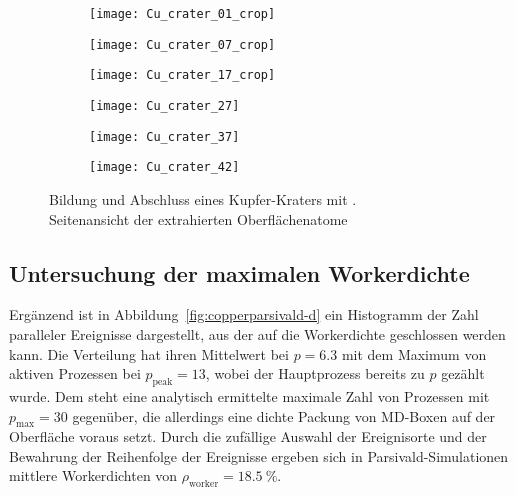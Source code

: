 \begin{figure}

  \captionsetup[subfigure]{justification=centering,singlelinecheck=false}
  \def\subfigwidth{0.32\textwidth}

  \begin{subfigure}[t]{\subfigwidth}
    \texttt{[image: Cu\_crater\_01\_crop]}
  \end{subfigure}
  \hfill
  \begin{subfigure}[t]{\subfigwidth}
    \texttt{[image: Cu\_crater\_07\_crop]}
  \end{subfigure}
  \hfill
  \begin{subfigure}[t]{\subfigwidth}
    \texttt{[image: Cu\_crater\_17\_crop]}
  \end{subfigure}

  \begin{subfigure}[t]{\subfigwidth}
    \texttt{[image: Cu\_crater\_27]}
  \end{subfigure}
  \hfill
  \begin{subfigure}[t]{\subfigwidth}
    \texttt{[image: Cu\_crater\_37]}
  \end{subfigure}
  \hfill
  \begin{subfigure}[t]{\subfigwidth}
    \texttt{[image: Cu\_crater\_42]}
  \end{subfigure}

  \caption[Bildung und Abschluss eines Kupfer-Kraters]{
    Bildung und Abschluss eines Kupfer-Kraters mit .\\
    Seitenansicht der extrahierten Oberflächenatome
  }
  \label{fig:coppercrater}
\end{figure}

\subsection{Untersuchung der maximalen Workerdichte}

Ergänzend ist in Abbildung~\ref{fig:copperparsivald-d} ein Histogramm der Zahl paralleler Ereignisse dargestellt, aus der auf die Workerdichte geschlossen werden kann.
Die Verteilung hat ihren Mittelwert bei $p = \num{6.3}$ mit dem Maximum von aktiven Prozessen bei $p_\text{peak} = \num{13}$, wobei der Hauptprozess bereits zu $p$ gezählt wurde.
Dem steht eine analytisch ermittelte maximale Zahl von Prozessen mit $p_\text{max} = \num{30}$ gegenüber, die allerdings eine dichte Packung von MD-Boxen auf der Oberfläche voraus setzt.
Durch die zufällige Auswahl der Ereignisorte und der Bewahrung der Reihenfolge der Ereignisse ergeben sich in Parsivald-Simulationen mittlere Workerdichten von $\rho_\text{worker} = \SI{18.5}{\percent}$.

